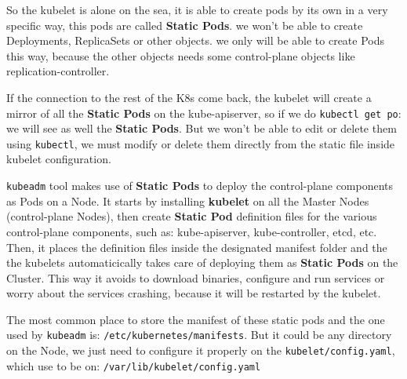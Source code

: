 \documentclass{article}
\begin{document}
So the kubelet is alone on the sea, it is able to create pods by its own in a very specific way, this pods are called \textbf{Static Pods}. we won't be able to create Deployments, ReplicaSets or other objects. we only will be able to create Pods this way, because the other objects needs some control-plane objects like replication-controller. 

If the connection to the rest of the K8s come back, the kubelet will create a mirror of all the \textbf{Static Pods} on the kube-apiserver, so if we do \verb|kubectl get po|: we will see as well the \textbf{Static Pods}. But we won't be able to edit or delete them using \verb|kubectl|, we must modify or delete them directly from the static file inside kubelet configuration.

\verb|kubeadm| tool makes use of \textbf{Static Pods} to deploy the control-plane components as Pods on a Node. It starts by installing \textbf{kubelet} on all the Master Nodes (control-plane Nodes), then create \textbf{Static Pod} definition files for the various control-plane components, such as: kube-apiserver, kube-controller, etcd, etc.
Then, it places the definition files inside the designated manifest folder and the the kubelets automaticically takes care of deploying
them as \textbf{Static Pods} on the Cluster. This way it avoids to download binaries, configure and run services or worry about the services crashing,
because it will be restarted by the kubelet.

The most common place to store the manifest of these static pods and the one used by \verb|kubeadm| is: \verb|/etc/kubernetes/manifests|. But it could be any directory on the Node, we just need to configure it properly on the \verb|kubelet/config.yaml|, which use to be on: \verb|/var/lib/kubelet/config.yaml|
\end{document}
